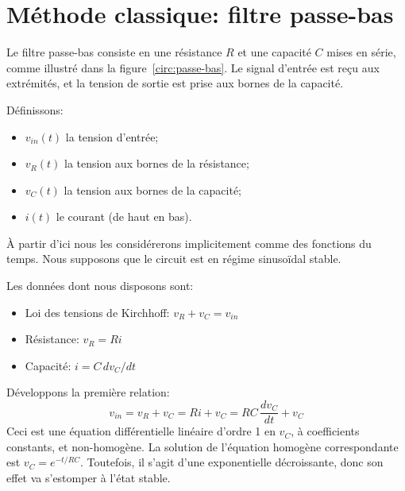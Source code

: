 \section{Méthode classique: filtre passe-bas}

Le filtre passe-bas consiste en une résistance $R$ et une capacité $C$
mises en série,
comme illustré dans la figure~\ref{circ:passe-bas}.
Le signal d'entrée est reçu aux extrémités, et la tension de sortie est prise
aux bornes de la capacité.

Définissons:
\begin{itemize}
    \item $v_{in}(t)$ la tension d'entrée;
    \item $v_R(t)$ la tension aux bornes de la résistance;
    \item $v_C(t)$ la tension aux bornes de la capacité;
    \item $i(t)$ le courant (de haut en bas).
\end{itemize}

À partir d'ici nous les considérerons implicitement
comme des fonctions du temps.
Nous supposons que le circuit est en régime sinusoïdal stable.

Les données dont nous disposons sont:
\begin{itemize}
    \item Loi des tensions de Kirchhoff: $v_R + v_C = v_{in}$
    \item Résistance: $v_R = Ri$
    \item Capacité: $i = C\,dv_C/dt$
\end{itemize}

Développons la première relation:
\begin{equation}
    v_{in} = v_R + v_C = Ri + v_C = RC\,\frac{dv_C}{dt} + v_C
\end{equation}
Ceci est une équation différentielle linéaire d'ordre 1 en $v_C$,
à coefficients constants, et non-homogène.
La solution de l'équation homogène correspondante est $v_C = e^{-t/RC}$.
Toutefois, il s'agit d'une exponentielle décroissante,
donc son effet va s'estomper à l'état stable.

